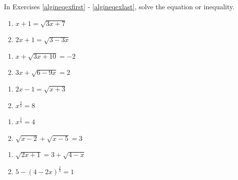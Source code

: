 \label{furtherequineqexercises}
In Exercises \ref{algineqexfirst} - \ref{algineqexlast}, solve the equation or inequality.  


\begin{multicols}{2}
\begin{enumerate}
\setcounter{enumi}{\value{HW}}

\item $x+1 = \sqrt{3x+7}$ \label{algineqexfirst}
\item  $2x+1 = \sqrt{3-3x}$

\setcounter{HW}{\value{enumi}}
\end{enumerate}
\end{multicols}

\begin{multicols}{2}
\begin{enumerate}
\setcounter{enumi}{\value{HW}}


\item  $x + \sqrt{3x+10} = -2$
\item  $3x+\sqrt{6-9x}=2$

\setcounter{HW}{\value{enumi}}
\end{enumerate}
\end{multicols}

\begin{multicols}{2}
\begin{enumerate}
\setcounter{enumi}{\value{HW}}


\item $2x - 1 = \sqrt{x + 3}$
\item $x^{\frac{3}{2}} = 8$

\setcounter{HW}{\value{enumi}}
\end{enumerate}
\end{multicols}

\begin{multicols}{2}
\begin{enumerate}
\setcounter{enumi}{\value{HW}}

\item $x^{\frac{2}{3}} = 4$
\item $\sqrt{x - 2} + \sqrt{x - 5} = 3$

\setcounter{HW}{\value{enumi}}
\end{enumerate}
\end{multicols}

\begin{multicols}{2}
\begin{enumerate}
\setcounter{enumi}{\value{HW}}

\item $\sqrt{2x+1} = 3 + \sqrt{4-x}$
\item  $5 - (4-2x)^{\frac{2}{3}} = 1$

\setcounter{HW}{\value{enumi}}
\end{enumerate}
\end{multicols}

